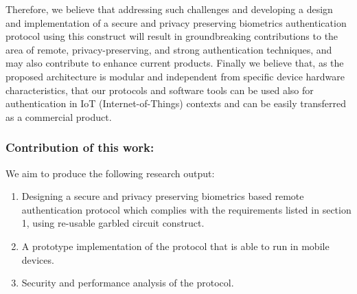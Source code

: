 \documentclass[10pt]{article}
\begin{document}
Therefore, we believe that addressing such challenges and developing a design and implementation of a secure and privacy preserving biometrics 
authentication protocol using this construct will result in groundbreaking contributions to the area of remote, privacy-preserving, and strong 
authentication techniques, and may also contribute to enhance current products. Finally we believe that, as the proposed architecture is modular and 
independent from specific device hardware characteristics, that our protocols and software tools can be used also for authentication in IoT 
(Internet-of-Things) contexts and can be easily transferred as a commercial product.
\subsubsection*{Contribution of this work:}
We aim to produce the following research output:
\begin{enumerate}
 \item Designing a secure and privacy preserving biometrics based remote authentication protocol which complies with the requirements listed in section 1, using re-usable 
garbled circuit construct. 
 \item A prototype implementation of the protocol that is able to run in mobile devices.
 \item Security and performance analysis of the protocol.
\end{enumerate}
\footnotesize


 
\end{document}
